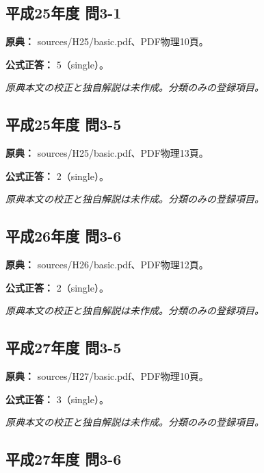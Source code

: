 \subsection{平成25年度 問3-1}
\label{q:h25-reg-basic-3-1}

\noindent\textbf{原典：} sources/H25/basic.pdf、PDF物理10頁。

\textbf{公式正答：} 5（single）。

\par\textit{原典本文の校正と独自解説は未作成。分類のみの登録項目。}

\subsection{平成25年度 問3-5}
\label{q:h25-reg-basic-3-5}

\noindent\textbf{原典：} sources/H25/basic.pdf、PDF物理13頁。

\textbf{公式正答：} 2（single）。

\par\textit{原典本文の校正と独自解説は未作成。分類のみの登録項目。}

\subsection{平成26年度 問3-6}
\label{q:h26-reg-basic-3-6}

\noindent\textbf{原典：} sources/H26/basic.pdf、PDF物理12頁。

\textbf{公式正答：} 2（single）。

\par\textit{原典本文の校正と独自解説は未作成。分類のみの登録項目。}

\subsection{平成27年度 問3-5}
\label{q:h27-reg-basic-3-5}

\noindent\textbf{原典：} sources/H27/basic.pdf、PDF物理10頁。

\textbf{公式正答：} 3（single）。

\par\textit{原典本文の校正と独自解説は未作成。分類のみの登録項目。}

\subsection{平成27年度 問3-6}
\label{q:h27-reg-basic-3-6}

